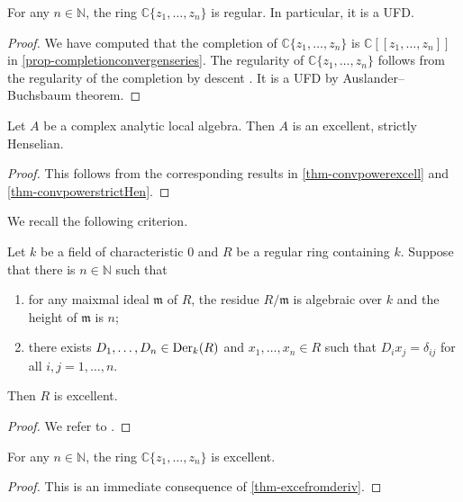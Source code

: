 \begin{thm}\label{thm-convpowerregular}
    For any $n\in \mathbb{N}$, the ring $\mathbb{C}\{ z_1,\ldots,z_n \}$ is regular. In particular, it is a UFD.
\end{thm}
\begin{proof}
    We have computed that the completion of $\mathbb{C}\{ z_1,\ldots,z_n \}$ is $\mathbb{C}[[ z_1,\ldots,z_n ]]$ in \cref{prop-completionconvergenseries}. The regularity of $\mathbb{C}\{ z_1,\ldots,z_n \}$ follows from the regularity of the completion by descent \cite[\href{https://stacks.math.columbia.edu/tag/07NY}{Tag 07NY}]{stacks-project}. It is a UFD by Auslander--Buchsbaum theorem.
\end{proof}
\begin{proposition}\label{prop-analocalgwellbehaved}
    Let $A$ be a complex analytic local algebra. Then $A$ is an excellent, strictly Henselian. 
\end{proposition}
\begin{proof}
    This follows from the corresponding results in \cref{thm-convpowerexcell} and \cref{thm-convpowerstrictHen}.
\end{proof}


We recall the following criterion.
\begin{thm}\label{thm-excefromderiv}
    Let $k$ be a field of characteristic $0$ and $R$ be a regular ring containing $k$. Suppose that there is $n\in \mathbb{N}$ such that
    \begin{enumerate}
        \item for any maixmal ideal $\mathfrak{m}$ of $R$, the residue $R/\mathfrak{m}$ is algebraic over $k$ and the height of $\mathfrak{m}$ is $n$;
        \item there exists $D_1,\ldots, D_n\in \operatorname{Der}_k(R)$ and $x_1,\ldots,x_n\in R$ such that $D_ix_j=\delta_{ij}$ for all $i,j=1,\ldots,n$. 
    \end{enumerate}
    Then $R$ is excellent.
\end{thm}
\begin{proof}
    We refer to \cite[Theorem~102]{Mat80}.
\end{proof}

\begin{thm}\label{thm-convpowerexcell}
    For any $n\in \mathbb{N}$, the ring $\mathbb{C}\{ z_1,\ldots,z_n \}$ is excellent.
\end{thm}
\begin{proof}
    This is an immediate consequence of \cref{thm-excefromderiv}.
\end{proof}


